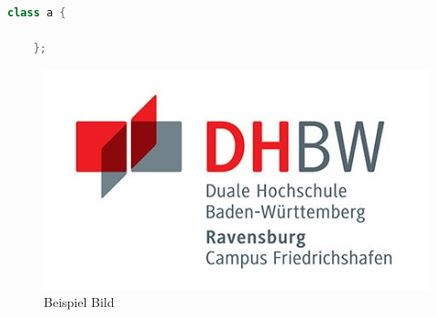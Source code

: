 \begin{lstlisting}[language=C++, caption=Beispiel Listing]
    class a {

    };
\end{lstlisting}

\begin{figure}[H]
    \centering
    \includegraphics[]{graphics/DHBW_logo.jpg}
    \caption{Beispiel Bild}
    \label{fig:bsp_bild}
\end{figure}

\newpage
